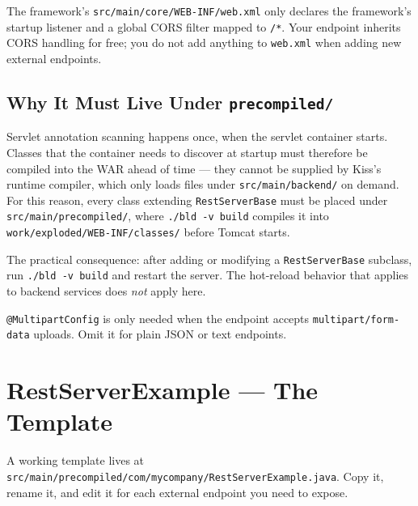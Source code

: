 \begin{notebox}
The framework's \texttt{src/main/core/WEB-INF/web.xml} only declares the framework's startup listener and a global CORS filter mapped to \texttt{/*}.  Your endpoint inherits CORS handling for free; you do not add anything to \texttt{web.xml} when adding new external endpoints.
\end{notebox}

\subsection{Why It Must Live Under \texttt{precompiled/}}

Servlet annotation scanning happens once, when the servlet container starts.  Classes that the container needs to discover at startup must therefore be compiled into the WAR ahead of time --- they cannot be supplied by Kiss's runtime compiler, which only loads files under \texttt{src/main/backend/} on demand.  For this reason, every class extending \texttt{RestServerBase} must be placed under \texttt{src/main/precom\-piled/}, where \texttt{./bld -v build} compiles it into \texttt{work/exploded/WEB-INF/classes/} before Tomcat starts.

The practical consequence: after adding or modifying a \texttt{RestServerBase} subclass, run \texttt{./bld -v build} and restart the server.  The hot-reload behavior that applies to backend services does \emph{not} apply here.

\begin{tipbox}
\texttt{@MultipartConfig} is only needed when the endpoint accepts \texttt{multi\-part/form-data} uploads.  Omit it for plain JSON or text endpoints.
\end{tipbox}

\section{RestServerExample --- The Template}
\label{sec:ext-restserverexample}

A working template lives at \texttt{src/main/precom\-piled/com/mycompany/Rest\-Server\-Example.java}.  Copy it, rename it, and edit it for each external endpoint you need to expose.

